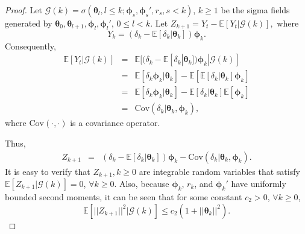 \begin{proof}
    Let $\mathcal{G}(k)=\sigma(\bm{\bm{\theta}}_l,l\leq k;\bm{\bm{\phi}}_s,\bm{\bm{\phi}}_s',r_s,s<k)$, 
    $k\geq 1$ be the sigma fields
    generated by $\bm{\bm{\theta}}_0,\bm{\bm{\theta}}_{l+1},\bm{\bm{\phi}}_l,\bm{\bm{\phi}}_l'$,
    $0\leq l<k$.
    Let 
    $
    Z_{k+1} = Y_{t}-\mathbb{E}[Y_{t}|\mathcal{G}(k)],
    $
    where
    \begin{equation*}
    Y_{k}=(\delta_k-\mathbb{E}[\delta_k|\bm{\bm{\theta}}_k])\bm{\bm{\phi}}_k.
    \end{equation*}
    Consequently,
    \begin{equation*}
    \begin{array}{ccl}
    \mathbb{E}[Y_t|\mathcal{G}(k)]&=&\mathbb{E}[(\delta_k-\mathbb{E}[\delta_k|\bm{\bm{\theta}}_k])\bm{\bm{\phi}}_k|\mathcal{G}(k)]\\
    &=&\mathbb{E}[\delta_k\bm{\bm{\phi}}_k|\bm{\bm{\theta}}_k]
    -\mathbb{E}[\mathbb{E}[\delta_k|\bm{\bm{\theta}}_k]\bm{\bm{\phi}}_k]\\
    &=&\mathbb{E}[\delta_k\bm{\bm{\phi}}_k|\bm{\bm{\theta}}_k]
    -\mathbb{E}[\delta_k|\bm{\bm{\theta}}_k]\mathbb{E}[\bm{\bm{\phi}}_k]\\
    &=&\mathrm{Cov}(\delta_k|\bm{\bm{\theta}}_k,\bm{\bm{\phi}}_k),
    \end{array}
    \end{equation*}
    where $\mathrm{Cov}(\cdot,\cdot)$ is a covariance operator.
    
     Thus,
     \begin{equation*}
    \begin{array}{ccl}
    Z_{k+1}&=&(\delta_k-\mathbb{E}[\delta_k|\bm{\bm{\theta}}_k])\bm{\bm{\phi}}_k-\mathrm{Cov}(\delta_k|\bm{\bm{\theta}}_k,\bm{\bm{\phi}}_k).
    \end{array}
    \end{equation*}
    It is easy to verify that $Z_{k+1},k\geq0$ are integrable random variables that 
    satisfy $\mathbb{E}[Z_{k+1}|\mathcal{G}(k)]=0$, $\forall k\geq0$.
    Also, because $\bm{\bm{\phi}}_k$, $r_k$, and $\bm{\bm{\phi}}_k'$  have
    uniformly bounded second moments, it can be seen that for some constant
    $c_2>0$, $\forall k\geq0$,
    \begin{equation*}
    \mathbb{E}[||Z_{k+1}||^2|\mathcal{G}(k)]\leq
    c_2(1+||\bm{\bm{\theta}}_k||^2).
    \end{equation*}
    

\end{proof}
